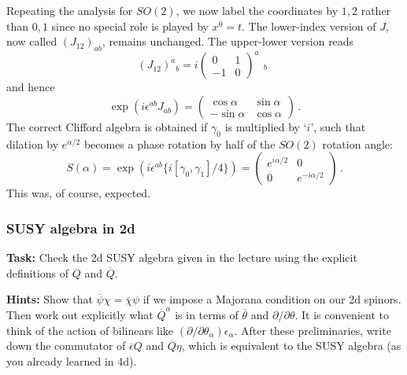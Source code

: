 \documentclass[12pt]{article}
\newcommand{\be}{\begin{equation}}
\newcommand{\ee}{\end{equation}}
\newcommand{\ol}{\overline}
\numberwithin{equation}{section}
\begin{document}
Repeating the analysis for $SO(2)$, we now label the coordinates by $1,2$ rather than $0,1$ since no special role is played by $x^0=t$. The lower-index version of $J$, now called $(J_{12})_{ab}$, remains unchanged. The upper-lower version reads
\be
(J_{12})^a{}_b=i\left(\begin{array}{rr} 0 & 1 \\ -1 & 0 \end{array}
\right)^a\!\!\begin{array}{c}{} \\ {}_b \end{array}
\ee
and hence 
\be
\exp(i\epsilon^{ab}J_{ab})=
\left(\begin{array}{rr} \cos\alpha & \sin \alpha \\ -\sin \alpha & \cos \alpha \end{array} \right) \,.
\ee
The correct Clifford algebra is obtained if $\gamma_0$ is multiplied by `$i$', such that dilation by $e^{\alpha/2}$ becomes a phase rotation by half of the $SO(2)$ rotation angle:
\be
S(\alpha)=\exp(i\epsilon^{ab}\{i[\gamma_0,\gamma_1]/4\})=
\left(\begin{array}{cc} e^{i\alpha/2} & 0 \\ 0 & e^{-i\alpha/2} \end{array} \right)\,.
\ee
This was, of course, expected.






\subsubsection{SUSY algebra in 2d}

{\bf Task:} Check the 2d SUSY algebra given in the lecture using the explicit definitions of $Q$ and $\ol{Q}$.

\noindent
{\bf Hints:} Show that $\ol{\psi}\chi=\ol{\chi}\psi$ if we impose a Majorana condition on our 2d spinors. Then work out explicitly what $\ol{Q}^\alpha$ is in terms of $\ol{\theta}$ and $\partial/\partial\theta$. It is convenient to think of the action of bilinears like $(\partial/\partial\theta_\alpha)\epsilon_\alpha$. After these preliminaries, write down the commutator of $\ol{\epsilon}Q$ and $\ol{Q}\eta$, which is equivalent to the SUSY algebra (as you already learned in 4d). 
\end{document}
